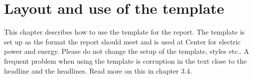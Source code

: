 \chapter{Layout and use of the template }
This chapter describes how to use the template for the report. The template is set up as the format the report should meet and is used at Center for electric power and energy. Please do not change the setup of the template, styles etc.. A frequent problem when using the template is corruption in the text close to the headline and the headlines. Read more on this in chapter 3.4.

\FloatBarrier

\FloatBarrier

\FloatBarrier

\FloatBarrier

\FloatBarrier

\FloatBarrier

\FloatBarrier

\FloatBarrier

\FloatBarrier

\FloatBarrier